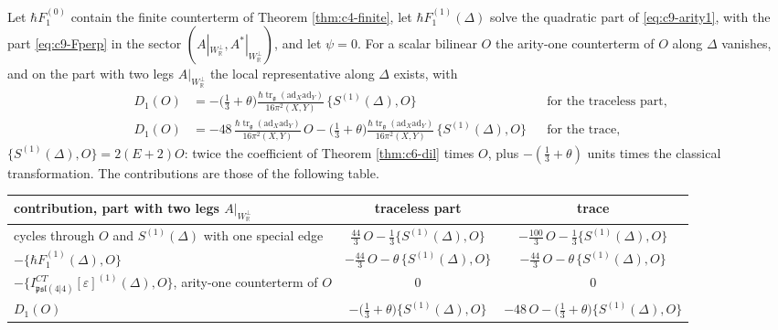 \begin{theorem}
\label{thm:c9-D1}
Let $\hbar F_1^{(0)}$ contain the finite counterterm of Theorem \ref{thm:c4-finite}, let $\hbar F_1^{(1)}(\Delta)$ solve the quadratic part of \eqref{eq:c9-arity1}, with the part \eqref{eq:c9-Fperp} in the sector $(A|_{W_{\mathbb R}^\perp},A^*|_{W_{\mathbb R}^\perp})$, and let $\psi=0$. For a scalar bilinear $O$ the arity-one counterterm of $O$ along $\Delta$ vanishes, and on the part with two legs $A|_{W_{\mathbb R}^\perp}$ the local representative along $\Delta$ exists, with
\begin{equation}
\begin{aligned}
D_1(O)&=-\big(\tfrac13+\theta\big)\frac{\hbar\operatorname{tr}_{\mathfrak g}(\mathrm{ad}_X\mathrm{ad}_Y)}{16\pi^2(X,Y)}\,\{S^{(1)}(\Delta),O\}&&\text{for the traceless part},\\
D_1(O)&=-48\,\frac{\hbar\operatorname{tr}_{\mathfrak g}(\mathrm{ad}_X\mathrm{ad}_Y)}{16\pi^2(X,Y)}\,O-\big(\tfrac13+\theta\big)\frac{\hbar\operatorname{tr}_{\mathfrak g}(\mathrm{ad}_X\mathrm{ad}_Y)}{16\pi^2(X,Y)}\,\{S^{(1)}(\Delta),O\}&&\text{for the trace},
\end{aligned}
\label{eq:c9-D1}
\end{equation}
$\{S^{(1)}(\Delta),O\}=2(E+2)O$: twice the coefficient of Theorem \ref{thm:c6-dil} times $O$, plus $-(\tfrac13+\theta)$ units times the classical transformation. The contributions are those of the following table.
\end{theorem}

\begin{tabular}{l|c|c}
contribution, part with two legs $A|_{W_{\mathbb R}^\perp}$ & traceless part & trace \\
\hline
cycles through $O$ and $S^{(1)}(\Delta)$ with one special edge & $\tfrac{44}3\,O-\tfrac13\{S^{(1)}(\Delta),O\}$ & $-\tfrac{100}3\,O-\tfrac13\{S^{(1)}(\Delta),O\}$ \\
$-\{\hbar F_1^{(1)}(\Delta),O\}$ & $-\tfrac{44}3\,O-\theta\,\{S^{(1)}(\Delta),O\}$ & $-\tfrac{44}3\,O-\theta\,\{S^{(1)}(\Delta),O\}$ \\
$-\{I^{CT}_{\mathfrak{psl}(4|4)}[\varepsilon]^{(1)}(\Delta),O\}$, arity-one counterterm of $O$ & $0$ & $0$ \\
\hline
$D_1(O)$ & $-\big(\tfrac13+\theta\big)\{S^{(1)}(\Delta),O\}$ & $-48\,O-\big(\tfrac13+\theta\big)\{S^{(1)}(\Delta),O\}$ \\
\end{tabular}

